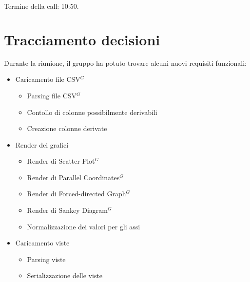 \noindent Termine della call: 10:50.

\section{Tracciamento decisioni}


\noindent Durante la riunione, il gruppo ha potuto trovare alcuni nuovi requisiti funzionali: 
\begin{itemize}
	\item Caricamento file CSV$^{G}$
	\begin{itemize}
		\item Parsing file CSV$^{G}$
		\item Contollo di colonne possibilmente derivabili
		\item Creazione colonne derivate
	\end{itemize}
	\item Render dei grafici
	\begin{itemize}
		\item Render di Scatter Plot$^{G}$
		\item Render di Parallel Coordinates$^{G}$
		\item Render di Forced-directed Graph$^{G}$
		\item Render di Sankey Diagram$^{G}$
		\item Normalizzazione dei valori per gli assi
	\end{itemize}
	\item Caricamento viste
	\begin{itemize}
		\item Parsing viste
		\item Serializzazione delle viste
	\end{itemize}
\end{itemize}
